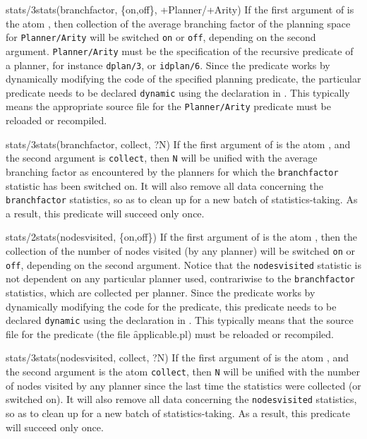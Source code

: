 \begin{predicate}{stats/3}{stats(branchfactor, \{on,off\}, +Planner/+Arity)}%
If the first argument of  is the atom {\tt {}},
then collection of the average branching factor of the planning space for
{\tt Planner/Arity} will be switched {\tt on} or {\tt off}, depending
on the second argument. {\tt Planner/Arity} must be the specification
of the recursive predicate of a planner, for instance {\tt dplan/3},
or {\tt idplan/6}.
Since the  predicate works by 
dynamically modifying the code of the specified planning predicate,
the particular predicate needs to be declared {\tt dynamic} using the
 declaration in .
\notnice
This typically means the
appropriate source file for the {\tt Planner/Arity} predicate must be
reloaded or recompiled.
\end{predicate}

\begin{predicate}{stats/3}{stats(branchfactor, collect, ?N)}%
If the first argument of  is the atom {\tt {}},
and the second argument is {\tt collect}, then {\tt N} will be unified
with the average branching factor as encountered by the planners for
which the {\tt branchfactor} statistic has been switched on. It will
also remove all data concerning the {\tt branchfactor} statistics, so
as to clean up for a new batch of statistics-taking. As a result, this
predicate will succeed only once.
\end{predicate}

\begin{predicate}{stats/2}{stats(nodesvisited, \{on,off\})}%
If the first argument of  is the atom {\tt {}},
then the collection of the number of nodes visited (by any planner)
will be switched {\tt on} or {\tt off}, depending on the second
argument. Notice that the {\tt nodesvisited} statistic is not
dependent on any particular planner used, contrariwise to the
{\tt branchfactor} statistics, which are collected per planner. Since
the  predicate works by dynamically modifying the code for
the  predicate, this predicate needs to be declared {
\tt dynamic} using the  declaration in .
This typically means that the source file for the 
predicate (the file \f{applicable.pl}) must be reloaded or recompiled. 
\end{predicate}

\begin{predicate}{stats/3}{stats(nodesvisited, collect, ?N)}%
If the first argument of  is the atom {\tt {}},
and the second argument is the atom {\tt collect}, then {\tt N} will
be unified with the number of nodes visited by any planner since the
last time the statistics were collected (or switched on). It will also
remove all data concerning the {\tt nodesvisited} statistics, so as to
clean up for a new batch of statistics-taking. As a result, this
predicate will succeed only once.
\end{predicate}

